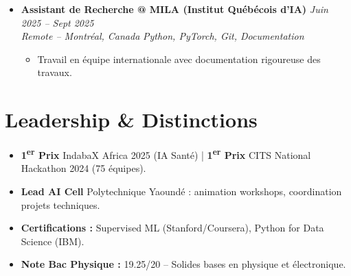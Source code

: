 \documentclass[a4paper,11pt]{article}
\begin{document}
\begin{itemize}[leftmargin=*, label={-}]
\item \textbf{Assistant de Recherche @ MILA (Institut Québécois d'IA)} \hfill \textit{Juin 2025 -- Sept 2025} \\
\textit{Remote -- Montréal, Canada} \hfill \textit{Python, PyTorch, Git, Documentation}
\vspace{-2pt}
    \begin{itemize}[leftmargin=0.4cm, nosep, label=\tiny$\bullet$]
        \item \small{Travail en équipe internationale avec documentation rigoureuse des travaux.}
    \end{itemize}
\vspace{3pt}

\end{itemize}

\section{Leadership \& Distinctions}
\begin{itemize}[leftmargin=*, label=\tiny$\bullet$, nosep]
    \item \small{\textbf{1\textsuperscript{er} Prix} IndabaX Africa 2025 (IA Santé) | \textbf{1\textsuperscript{er} Prix} CITS National Hackathon 2024 (75 équipes).}
    \item \small{\textbf{Lead AI Cell} Polytechnique Yaoundé : animation workshops, coordination projets techniques.}
    \item \small{\textbf{Certifications :} Supervised ML (Stanford/Coursera), Python for Data Science (IBM).}
    \item \small{\textbf{Note Bac Physique :} 19.25/20 -- Solides bases en physique et électronique.}
\end{itemize}
\end{document}
